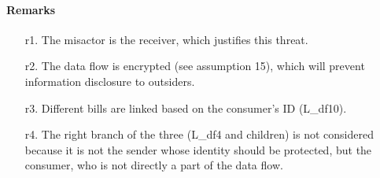 \paragraph{Remarks}
\begin{enumerate}
	\item[r1.] The misactor is the receiver, which justifies this threat.
	\item[r2.] The data flow is encrypted (see assumption 15), which will prevent
	information disclosure to outsiders.
	\item[r3.] Different bills are linked based on the consumer's ID (L\_df10). 
	\item[r4.] The right branch of the three (L\_df4 and children) is not
	considered because it is not the sender whose identity should be protected, but the
	consumer, who is not directly a part of the data flow.
\end{enumerate}

